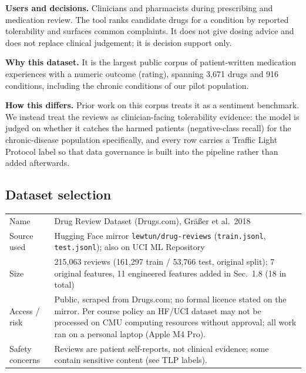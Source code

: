 \documentclass[11pt]{article}
\newcommand{\code}[1]{\texttt{#1}}
\begin{document}
\textbf{Users and decisions.} Clinicians and pharmacists during prescribing and medication review. The tool ranks candidate drugs for a condition by reported tolerability and surfaces common complaints. It does not give dosing advice and does not replace clinical judgement; it is decision support only.

\textbf{Why this dataset.} It is the largest public corpus of patient-written medication experiences with a numeric outcome (rating), spanning 3,671 drugs and 916 conditions, including the chronic conditions of our pilot population.

\textbf{How this differs.} Prior work on this corpus treats it as a sentiment benchmark. We instead treat the reviews as clinician-facing tolerability evidence: the model is judged on whether it catches the harmed patients (negative-class recall) for the chronic-disease population specifically, and every row carries a Traffic Light Protocol label so that data governance is built into the pipeline rather than added afterwards.

\subsection{Dataset selection}
\begin{table}[H]\centering\small
\begin{tabular}{p{2.9cm}p{12.1cm}}\toprule
Name & Drug Review Dataset (Drugs.com), Gr\"a{\ss}er et al.\ 2018 \\
Source used & Hugging Face mirror \code{lewtun/drug-reviews} (\code{train.jsonl}, \code{test.jsonl}); also on UCI ML Repository \\
Size & 215,063 reviews (161,297 train / 53,766 test, original split); 7 original features, 11 engineered features added in Sec.~1.8 (18 in total) \\
Access / risk & Public, scraped from Drugs.com; no formal licence stated on the mirror. Per course policy an HF/UCI dataset may not be processed on CMU computing resources without approval; all work ran on a personal laptop (Apple M4 Pro). \\
Safety concerns & Reviews are patient self-reports, not clinical evidence; some contain sensitive content (see TLP labels). \\
\bottomrule\end{tabular}
\end{table}
\end{document}
